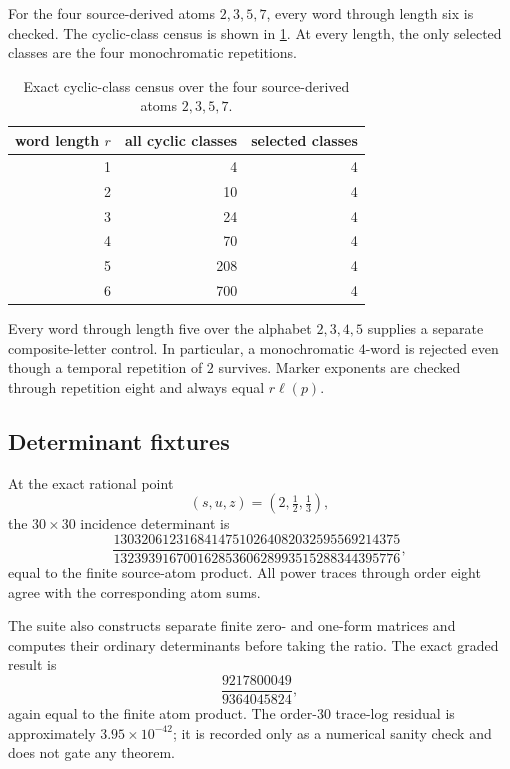 For the four source-derived atoms \(2,3,5,7\), every word through length six
is checked. The cyclic-class census is shown in
\cref{tab:necklace-census}. At every length, the only selected classes are
the four monochromatic repetitions.

\begin{table}[t]
\centering
\small
\caption{Exact cyclic-class census over the four source-derived atoms
\(2,3,5,7\).}
\label{tab:necklace-census}
\begin{tabular}{rrr}
\toprule
word length \(r\) & all cyclic classes & selected classes \\
\midrule
1 & 4 & 4 \\
2 & 10 & 4 \\
3 & 24 & 4 \\
4 & 70 & 4 \\
5 & 208 & 4 \\
6 & 700 & 4 \\
\bottomrule
\end{tabular}
\end{table}

Every word through length five over the alphabet \(2,3,4,5\) supplies a
separate composite-letter control. In particular, a monochromatic \(4\)-word
is rejected even though a temporal repetition of \(2\) survives. Marker
exponents are checked through repetition eight and always equal
\(r\ell(p)\).

\subsection{Determinant fixtures}

At the exact rational point
\[
(s,u,z)=(2,\tfrac12,\tfrac13),
\]
the \(30\times30\) incidence determinant is
\begin{equation}
\frac{
13032061231684147510264082032595569214375
}{
13239391670016285360628993515288344395776
},
\label{eq:exact-incidence-determinant}
\end{equation}
equal to the finite source-atom product. All power traces through order eight
agree with the corresponding atom sums.

The suite also constructs separate finite zero- and one-form matrices and
computes their ordinary determinants before taking the ratio. The exact
graded result is
\begin{equation}
\frac{9217800049}{9364045824},
\label{eq:exact-graded-ratio}
\end{equation}
again equal to the finite atom product. The order-30 trace-log residual is
approximately \(3.95\times10^{-42}\); it is recorded only as a numerical
sanity check and does not gate any theorem.

